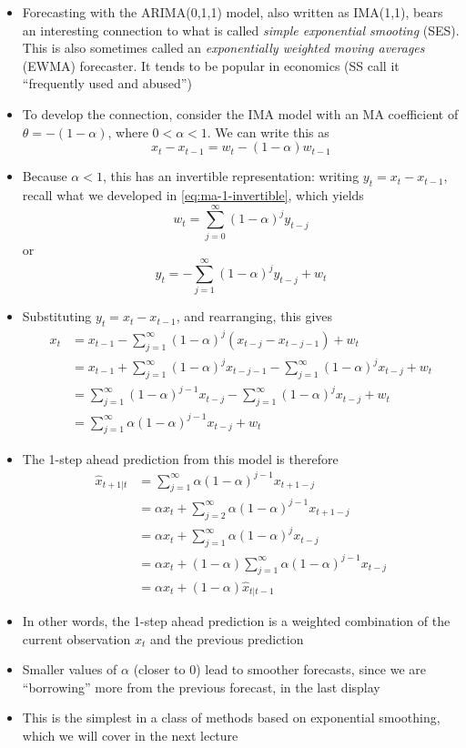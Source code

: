 \documentclass{article}
\begin{document}
\begin{itemize}
\item Forecasting with the ARIMA(0,1,1) model, also written as IMA(1,1), bears
  an interesting connection to what is called \emph{simple exponential 
    smooting} (SES). This is also sometimes called an \emph{exponentially
    weighted moving averages} (EWMA) forecaster. It tends to be popular in
  economics (SS call it ``frequently used and abused'')     

\item To develop the connection, consider the IMA model with an MA coefficient
  of $\theta = -(1-\alpha)$, where $0 < \alpha < 1$. We can write this as  
  \[
  x_t - x_{t-1} = w_t - (1-\alpha) w_{t-1}
  \]

\item Because $\alpha < 1$, this has an invertible representation: writing $y_t
  = x_t - x_{t-1}$, recall what we developed in \eqref{eq:ma-1-invertible},
  which yields 
  \[
  w_t = \sum_{j=0}^\infty (1-\alpha)^j y_{t-j} 
  \]
  or
  \[
  y_t = -\sum_{j=1}^\infty (1-\alpha)^j y_{t-j} + w_t
  \]
  
\item Substituting $y_t = x_t - x_{t-1}$, and rearranging, this gives 
  \begin{align*}
  x_t &= x_{t-1} - \sum_{j=1}^\infty (1-\alpha)^j (x_{t-j} - x_{t-j-1}) + w_t \\
  &= x_{t-1} + \sum_{j=1}^\infty (1-\alpha)^j x_{t-j-1} - \sum_{j=1}^\infty
    (1-\alpha)^j x_{t-j} + w_t \\
  &= \sum_{j=1}^\infty (1-\alpha)^{j-1} x_{t-j} - \sum_{j=1}^\infty (1-\alpha)^j
    x_{t-j} + w_t \\
  &= \sum_{j=1}^\infty \alpha (1-\alpha)^{j-1} x_{t-j} + w_t 
  \end{align*}

\item The 1-step ahead prediction from this model is therefore  
  \begin{align*}
  \hat{x}_{t+1 | t} &= \sum_{j=1}^\infty \alpha (1-\alpha)^{j-1} x_{t+1-j} \\  
  &= \alpha x_t + \sum_{j=2}^\infty \alpha (1-\alpha)^{j-1} x_{t+1-j} 
    \\
  &= \alpha x_t + \sum_{j=1}^\infty \alpha (1-\alpha)^j x_{t-j} \\
  &= \alpha x_t + (1-\alpha) \sum_{j=1}^\infty \alpha (1-\alpha)^{j-1}
    x_{t-j} \\
  &= \alpha x_t + (1-\alpha) \hat{x}_{t | t-1}
  \end{align*}

\item In other words, the 1-step ahead prediction is a weighted combination of
  the current observation $x_t$ and the previous prediction 

\item Smaller values of $\alpha$ (closer to 0) lead to smoother forecasts, since
  we are ``borrowing'' more from the previous forecast, in the last
  display

\item This is the simplest in a class of methods based on exponential smoothing,
  which we will cover in the next lecture
\end{itemize}
\end{document}
